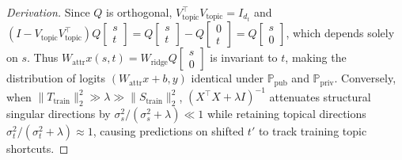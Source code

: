 \documentclass[11pt,a4paper]{article}
\begin{document}
\begin{proof}[Derivation]
Since $Q$ is orthogonal, $V_{\text{topic}}^\top V_{\text{topic}} = I_{d_t}$ and $(I - V_{\text{topic}} V_{\text{topic}}^\top) Q \begin{bmatrix} s \\ t \end{bmatrix} = Q \begin{bmatrix} s \\ t \end{bmatrix} - Q \begin{bmatrix} 0 \\ t \end{bmatrix} = Q \begin{bmatrix} s \\ 0 \end{bmatrix}$, which depends solely on $s$. Thus $W_{\text{attr}} x(s, t) = W_{\text{ridge}} Q \begin{bmatrix} s \\ 0 \end{bmatrix}$ is invariant to $t$, making the distribution of logits $(W_{\text{attr}} x + b, y)$ identical under $\mathbb{P}_{\text{pub}}$ and $\mathbb{P}_{\text{priv}}$. Conversely, when $\|T_{\text{train}}\|_2^2 \gg \lambda \gg \|S_{\text{train}}\|_2^2$, $(X^\top X + \lambda I)^{-1}$ attenuates structural singular directions by $\sigma_s^2 / (\sigma_s^2 + \lambda) \ll 1$ while retaining topical directions $\sigma_t^2 / (\sigma_t^2 + \lambda) \approx 1$, causing predictions on shifted $t'$ to track training topic shortcuts.
\end{proof}
\end{document}
